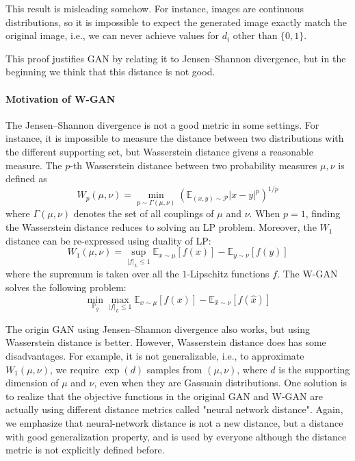 \begin{remark}
This result is misleading somehow. 
For instance, images are continuous distributions,
so it is impossible to expect the generated image exactly match the original image, i.e., 
we can never achieve values for $d_i$ other than $\{0,1\}$.
\end{remark}
\begin{remark}
This proof justifies GAN by relating it to Jensen–Shannon divergence, but in the beginning we think that this distance is not good. 
\end{remark}

\paragraph{Motivation of W-GAN}
The Jensen–Shannon divergence is not a good metric in some settings.
For instance, it is impossible to measure the distance between two distributions with the different supporting set, but Wasserstein distance givens a reasonable measure. 
The $p$-th Wasserstein distance between two probability measures $\mu,\nu$ is defined as
\[
W_p(\mu,\nu)=\min_{p\sim\Gamma(\mu,\nu)}\left(\mathbb{E}_{(x,y)\sim\mathcal{P}}|x-y|^p\right)^{1/p}
\]
where $\Gamma(\mu,\nu)$ denotes the set of all couplings of $\mu$ and $\nu$.
When $p=1$, finding the Wasserstein distance reduces to solving an LP problem.
Moreover, the $W_1$ distance can be re-expressed using duality of LP:
\[
W_1(\mu,\nu)=\sup_{|f|_L\le1}
\mathbb{E}_{x\sim\mu}[f(x)]
-
\mathbb{E}_{y\sim\nu}[f(y)]
\]
where the supremum is taken over all the $1$-Lipschitz functions $f$.
The W-GAN solves the following problem:
\[
\min_{\mathbb{P}_g}\max_{|f|_L\le1}
\mathbb{E}_{x\sim\mu}[f(x)]
-
\mathbb{E}_{\hat{x}\sim\nu}[f(\hat{x})]
\]
\begin{remark}
The origin GAN using Jensen–Shannon divergence also works, but using Wasserstein distance is better. However, Wasserstein distance does has some disadvantages.
For example, it is not generalizable, i.e., to approximate $W_1(\mu,\nu)$, we require $\exp(d)$ samples from $(\mu,\nu)$, where $d$ is the supporting dimension of $\mu$ and $\nu$, even when they are Gassuain distributions.
One solution is to realize that the objective functions in the original GAN and W-GAN are actually using different distance metrics called "neural network distance". Again, we emphasize that neural-network distance is not a new distance, but a distance with good generalization property, and is used by everyone although the distance metric is not explicitly defined before.

\end{remark}
























